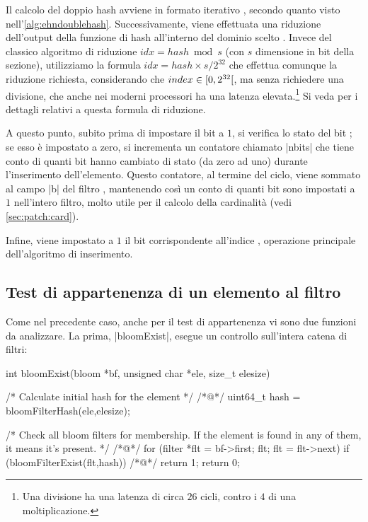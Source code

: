 Il calcolo del doppio hash avviene in formato iterativo , secondo quanto visto
nell'\autoref{alg:ehndoublehash}. Successivamente, viene effettuata una riduzione dell'output della
funzione di hash all'interno del dominio scelto . Invece del classico algoritmo di
riduzione $idx = hash \bmod s$ (con $s$ dimensione in bit della sezione), utilizziamo la formula
$idx = hash \times s / 2^{32}$ che effettua comunque la riduzione richiesta, considerando che $index
\in \interval[open right]{0}{2^{32}}$, ma senza richiedere una divisione, che anche nei moderni
processori ha una latenza elevata.\footnote{Una divisione ha una latenza di circa $26$ cicli,
contro i $4$ di una moltiplicazione.} Si veda \cite{lemire-reduction} per i dettagli relativi a
questa formula di riduzione.

A questo punto, subito prima di impostare il bit a $1$, si verifica lo stato del bit ; se
esso è impostato a zero, si incrementa un contatore chiamato \cverb|nbits| che tiene conto di quanti
bit hanno cambiato di stato (da zero ad uno) durante l'inserimento dell'elemento. Questo contatore,
al termine del ciclo, viene sommato al campo \cverb|b| del filtro , mantenendo così un conto
di quanti bit sono impostati a $1$ nell'intero filtro, molto utile per il calcolo della cardinalità
(vedi \autoref{sec:patch:card}).

Infine, viene impostato a $1$ il bit corrispondente all'indice , o\-pe\-ra\-zio\-ne
principale dell'algoritmo di inserimento.

\subsection{Test di appartenenza di un elemento al filtro}

Come nel precedente caso, anche per il test di appartenenza vi sono due funzioni da analizzare.
La prima, \cverb|bloomExist|, esegue un controllo sull'intera catena di filtri:

\begin{commentedsource}[style=csource,caption=Test di appartenenza di un elemento,label={lst:bloomExist}]
int bloomExist(bloom *bf, unsigned char *ele, size_t elesize) {
    /* Calculate initial hash for the element */
/*@\lnote@*/    uint64_t hash = bloomFilterHash(ele,elesize);

    /* Check all bloom filters for membership. If the element is
       found in any of them, it means it's present. */
/*@\lnote@*/    for (filter *flt = bf->first; flt; flt = flt->next)
        if (bloomFilterExist(flt,hash))
/*@\lnote@*/            return 1;
    return 0;
}
\end{commentedsource}

